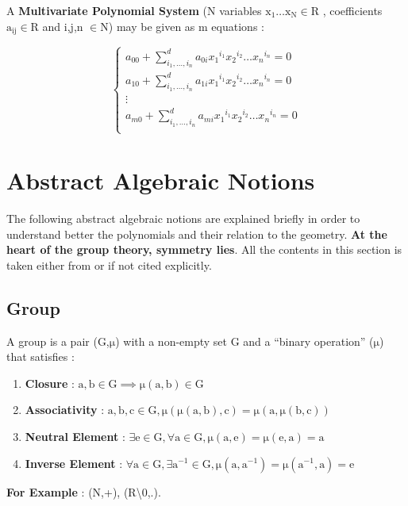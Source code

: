 \documentclass[11pt]{article}
\begin{document}
A \textbf{Multivariate Polynomial System}  (N variables  $\mathrm{x_1 \ldots x_N \in R}$ ,  coefficients  $\mathrm{a_{ij} \in R}$  and i,j,n $\mathrm{\in N}$) may be given as m equations :

\begin{equation}
   \begin{cases}
    a_{00}+\sum_{i_1,\ldots,i_n}^{d}{a_{0i}{x_1}^{i_1}{x_2}^{i_2} \ldots {x_n}^{i_n} }=0 \\
    a_{10}+\sum_{i_1,\ldots,i_n}^{d}{a_{1i}{x_1}^{i_1}{x_2}^{i_2} \ldots {x_n}^{i_n} }=0 \\
    \vdots \\
    a_{m0}+\sum_{i_1,\ldots,i_n}^{d}{a_{mi}{x_1}^{i_1}{x_2}^{i_2} \ldots {x_n}^{i_n} }=0 \\
  \end{cases}
\end{equation}


\section{Abstract Algebraic Notions}

The following abstract algebraic notions are explained briefly in order to understand better the  polynomials and their relation to the geometry. \textbf{At the heart of the group theory, symmetry lies}. All the contents in this section is taken either from \cite{abstractAlgebraBook} or \cite{coxLittleOshea} if not cited explicitly.

\subsection{Group}
A group is a pair (G,$\mathrm{\mu}$) with a non-empty set G and a “binary operation” ($\mathrm{\mu}$)  that satisfies  :
\begin{enumerate}
\item \textbf{Closure} : $\mathrm{a, b \in G \implies \mu(a,b) \in G}$
\item \textbf{Associativity} : $\mathrm{a, b, c \in G, \mu(\mu(a,b),c)=\mu(a,\mu(b,c))}$
\item \textbf{Neutral Element} : $\mathrm{\exists e \in G, \forall a \in G, \mu(a,e)=\mu(e,a)=a }$
\item \textbf{Inverse Element} : $\mathrm{\forall a \in G, \exists a^{-1} \in G , \mu(a,a^{-1})=\mu(a^{-1},a)=e}$
\end{enumerate}

\textbf{For Example} : (N,+), (R\textbackslash0,.). \\
\newline
\end{document}

